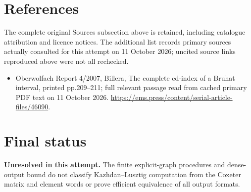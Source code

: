 \documentclass[11pt]{article}
\begin{document}
\section{References}
The complete original Sources subsection above is retained, including catalogue attribution and licence notices. The additional list records primary sources actually consulted for this attempt on 11 October 2026; uncited source links reproduced above were not all rechecked.
\begin{itemize}
\item Oberwolfach Report 4/2007, Billera, The complete cd-index of a Bruhat interval, printed pp.209--211; full relevant passage read from cached primary PDF text on 11 October 2026. \url{https://ems.press/content/serial-article-files/46090}.
\end{itemize}
\section{Final status}
\textbf{Unresolved in this attempt.} The finite explicit-graph procedures and dense-output bound do not classify Kazhdan--Lusztig computation from the Coxeter matrix and element words or prove efficient equivalence of all output formats.
\end{document}

